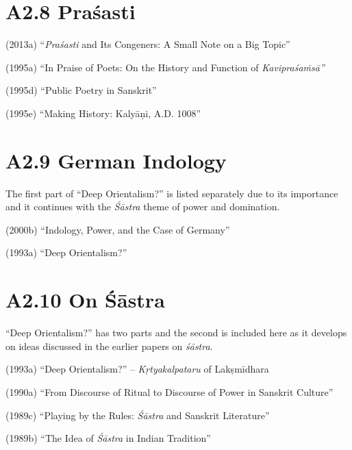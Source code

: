 \section*{A2.8 Praśasti}

\item (2013a) “\textit{Praśasti} and Its Congeners: A Small Note on a Big Topic”

 \item (1995a) “In Praise of Poets: On the History and Function of \textit{Kavipraśaṁsā”}

 \item (1995d) “Public Poetry in Sanskrit”

 \item (1995e) “Making History: Kalyāṇi, A.D. 1008”



\section*{A2.9 German Indology}

The first part of “Deep Orientalism?” is listed separately due to its importance and it continues with the \textit{Śāstra} theme of power and domination.

\item (2000b) “Indology, Power, and the Case of Germany”

 \item (1993a) “Deep Orientalism?”



\section*{A2.10 On Śāstra}

“Deep Orientalism?” has two parts and the second is included here as it develops on ideas discussed in the earlier papers on \textit{śāstra}.

\item (1993a) “Deep Orientalism?” – \textit{Kṛtyakalpataru} of Lakṣmīdhara

 \item (1990a) “From Discourse of Ritual to Discourse of Power in Sanskrit Culture”

 \item (1989c) “Playing by the Rules: \textit{Śāstra} and Sanskrit Literature”

 \item (1989b) “The Idea of \textit{Śāstra} in Indian Tradition”

